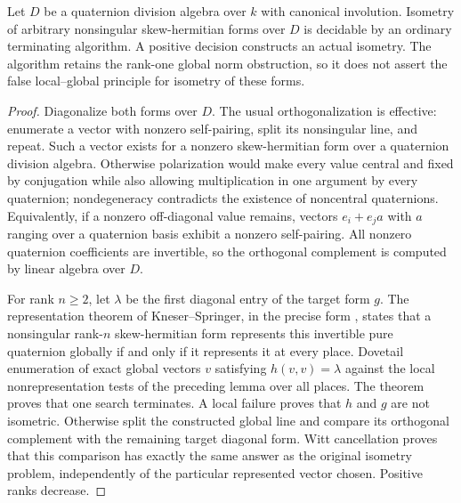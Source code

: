 \begin{theorem}
\label{C:global-function-skew-hermitian-isometry}
Let $D$ be a quaternion division algebra over $k$
with canonical involution.  Isometry of arbitrary
nonsingular skew-hermitian forms over $D$ is
decidable by an ordinary terminating algorithm.
A positive decision constructs an actual
isometry.  The algorithm retains the
rank-one global norm obstruction, so it
does not assert the false local--global
principle for isometry of these forms.
\end{theorem}
\begin{proof}
Diagonalize both forms over $D$.
The usual orthogonalization is effective:
enumerate a vector with nonzero self-pairing,
split its nonsingular line, and repeat.
Such a vector exists for a nonzero
skew-hermitian form over a quaternion
division algebra.  Otherwise polarization
would make every value central and fixed
by conjugation while also allowing
multiplication in one argument by every
quaternion; nondegeneracy contradicts
the existence of noncentral quaternions.
Equivalently, if a nonzero off-diagonal
value remains, vectors $e_i+e_ja$
with $a$ ranging over a quaternion
basis exhibit a nonzero self-pairing.
All nonzero quaternion coefficients
are invertible, so the orthogonal
complement is computed by linear
algebra over $D$.

For rank $n\geq2$, let $\lambda$
be the first diagonal entry of the
target form $g$.
The representation theorem of
Kneser--Springer, in the precise form
\cite[Theorem 2.7(ii), p.\ 7]{C-LewisUngerVanGeel2004},
states that a nonsingular rank-$n$
skew-hermitian form represents this
invertible pure quaternion globally
if and only if it represents it at
every place.
Dovetail enumeration of exact global
vectors $v$ satisfying $h(v,v)=\lambda$
against the local nonrepresentation
tests of the preceding lemma over
all places.
The theorem proves that one search
terminates.
A local failure proves that $h$ and
$g$ are not isometric.
Otherwise split the constructed
global line and compare its
orthogonal complement with the
remaining target diagonal form.
Witt cancellation proves that this
comparison has exactly the same
answer as the original isometry
problem, independently of the
particular represented vector chosen.
Positive ranks decrease.


\end{proof}

